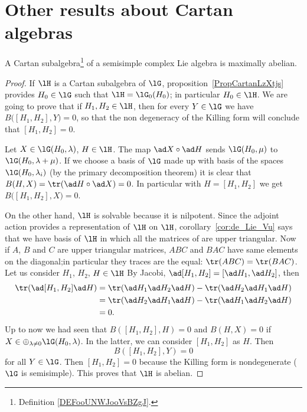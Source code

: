 \section{Other results about Cartan algebras}

\begin{lemma}
	A Cartan subalgebra\footnote{Definition \ref{DEFooUNWJooVsBZgJ}.} of a semisimple complex Lie algebra is maximally abelian.
\end{lemma}

\begin{proof}
	If \( \lH\) is a Cartan subalgebra of \( \lG\), proposition~\ref{PropCartanLzXtjs} provides \( H_0\in\lG\) such that \( \lH=\lG_0(H_0)\); in particular \( H_0\in\lH\). We are going to prove that if \( H_1,H_2\in\lH\), then for every \( Y\in\lG\) we have \( B\big( [H_1,H_2],Y \big)=0\), so that the non degeneracy of the Killing form will conclude that \( [H_1,H_2]=0\).


	Let $X\in\lG(H_0,\lambda)$, $H\in\lH$. The map $\ad X\circ\ad H$ sends $\lG(H_0,\mu)$ to $\lG(H_0,\lambda+\mu)$. If we choose a basis of $\lG$ made up with basis of the spaces $\lG(H_0,\lambda_i)$ (by the primary decomposition theorem) it is clear that $B(H,X)=\tr(\ad H\circ\ad X)=0$. In particular with \( H=[H_1,H_2]\) we get \( B\big( [H_1,H_2],X \big)=0\).

	On the other hand, $\lH$ is solvable because it is nilpotent. Since the adjoint action provides a representation of \( \lH\) on \( \lH\), corollary~\ref{cor:de_Lie_Vu} says that we have  basis of $\lH$ in which all the matrices of are upper triangular. Now if $A$, $B$ and $C$ are upper triangular matrices, $ABC$ and $BAC$ have same elements on the diagonal;in particular they traces are the equal: $\tr(ABC)=\tr(BAC)$. Let us consider $H_1$, $H_2$, $H\in\lH$ By Jacobi, $\ad[H_1,H_2]=[\ad H_1,\ad H_2]$, then
	\begin{equation}
		\begin{split}
			\tr(\ad[H_1,H_2]\ad H)&=\tr(\ad H_1\ad H_2\ad H)-\tr(\ad H_2\ad H_1\ad H)\\
			&=\tr(\ad H_2\ad H_1\ad H)-\tr(\ad H_1\ad H_2\ad H)\\
			&=0.
		\end{split}
	\end{equation}
	Up to now we had seen that $B([H_1,H_2],H)=0$ and $B(H,X)=0$ if $X\in\oplus_{\lambda\neq 0}\lG(H_0,\lambda)$. In the latter, we can consider $[H_1,H_2]$ as $H$. Then
	\[
		B([H_1,H_2],Y)=0
	\]
	for all $Y\in\lG$. Then $[H_1,H_2]=0$ because the Killing form is nondegenerate ($\lG$ is semisimple). This proves that $\lH$ is abelian.


\end{proof}
